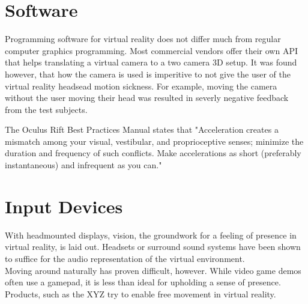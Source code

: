 \documentclass[11pt]{report}
\begin{document}
	\section{Software}
		Programming software for virtual reality does not differ much from regular computer graphics programming. Most commercial vendors offer their own API that helps translating a virtual camera to a two camera 3D setup. It was found however, that how the camera is used is imperitive to not give the user of the virtual reality headsead motion sickness. For example, moving the camera without the user moving their head was resulted in severly negative feedback from the test subjects.
		
		The Oculus Rift Best Practices Manual states that "Acceleration creates a mismatch among your visual, vestibular, and proprioceptive senses; minimize the duration and frequency of such conflicts. Make accelerations as short (preferably instantaneous) and infrequent as you can." \cite{yao2014oculus}
	
	\section{Input Devices}
	With headmounted displays, vision, the groundwork for a feeling of presence in virtual reality, is laid out. Headsets or surround sound systems have been shown to suffice for the audio representation of the virtual environment.\\
	Moving around naturally has proven difficult, however. While video game demos often use a gamepad, it is less than ideal for upholding a sense of presence. Products, such as the XYZ try to enable free movement in virtual reality.



	
	
	
\end{document}
